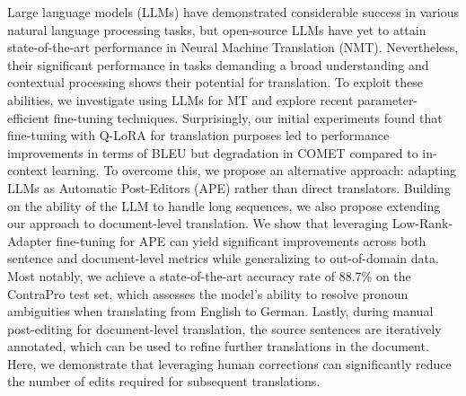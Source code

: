 Large language models (LLMs) have demonstrated considerable success in various natural language processing tasks, but open-source LLMs have yet to attain state-of-the-art performance in Neural Machine Translation (NMT). Nevertheless, their significant performance in tasks demanding a broad understanding and contextual processing shows their potential for translation. To exploit these abilities, we investigate using LLMs for MT and explore recent parameter-efficient fine-tuning techniques. Surprisingly, our initial experiments found that fine-tuning with Q-LoRA for translation purposes led to performance improvements in terms of BLEU but degradation in COMET compared to in-context learning. To overcome this, we propose an alternative approach: adapting LLMs as Automatic Post-Editors (APE) rather than direct translators. Building on the ability of the LLM to handle long sequences, we also propose extending our approach to document-level translation. We show that leveraging Low-Rank-Adapter fine-tuning for APE can yield significant improvements across both sentence and document-level metrics while generalizing to out-of-domain data. Most notably, we achieve a state-of-the-art accuracy rate of 88.7\% on the ContraPro test set, which assesses the model's ability to resolve pronoun ambiguities when translating from English to German. Lastly, during manual post-editing for document-level translation, the source sentences are iteratively annotated, which can be used to refine further translations in the document. Here, we demonstrate that leveraging human corrections can significantly reduce the number of edits required for subsequent translations.